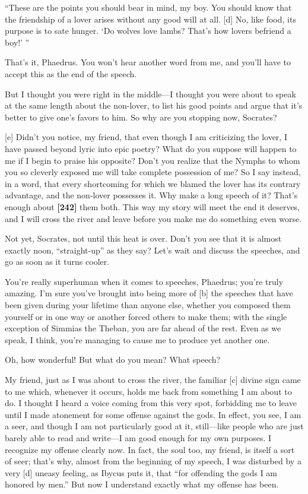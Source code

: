 “These are the points you should bear in mind, my boy. You should know
that the friendship of a lover arises without any good will at all.
{[}d{]} No, like food, its purpose is to sate hunger. ‘Do wolves love
lambs? That's how lovers befriend a boy!' ”

That's it, Phaedrus. You won't hear another word from me, and you'll
have to accept this as the end of the speech.

\sayphaedrus But I thought you were right in the middle---I thought you
were about to speak at the same length about the non-lover, to list his
good points and argue that it's better to give one's favors to him. So
why are you stopping now, Socrates?

{[}e{]} \saysocrates Didn't you notice, my friend, that even though I am
criticizing the lover, I have passed beyond lyric into epic
poetry? What do you
suppose will happen to me if I begin to praise his opposite? Don't you
realize that the Nymphs to whom you so cleverly exposed me will take
complete possession of me? So I say instead, in a word, that every
shortcoming for which we blamed the lover has its contrary advantage,
and the non-lover possesses it. Why make a long speech of it? That's
enough about {\bf {[}242{]}} them both. This way my story will meet the
end it deserves, and I will cross the river and leave before you make me
do something even worse.

\sayphaedrus Not yet, Socrates, not until this heat is over. Don't you see
that it is almost exactly noon, “straight-up” as they say? Let's wait
and discuss the speeches, and go as soon as it turns cooler.

\saysocrates You're really superhuman when it comes to speeches, Phaedrus;
you're truly amazing. I'm sure you've brought into being more of {[}b{]}
the speeches that have been given during your lifetime than anyone else,
whether you composed them yourself or in one way or another forced
others to make them; with the single exception of Simmias the Theban,
you are far ahead of the
rest. Even as we
speak, I think, you're managing to cause me to produce yet another one.

\sayphaedrus Oh, how wonderful! But what do you mean? What speech?

\saysocrates My friend, just as I was about to cross the river, the
familiar {[}c{]} divine sign came to me which, whenever it occurs, holds
me back from something I am about to do. I thought I heard a voice
coming from this very spot, forbidding me to leave until I made
atonement for some offense against the gods. In effect, you see, I am a
seer, and though I am not particularly good at it, still---like people
who are just barely able to read and write---I am good enough for my own
purposes. I recognize my offense clearly now. In fact, the soul too, my
friend, is itself a sort of seer; that's why, almost from the beginning
of my speech, I was disturbed by a very {[}d{]} uneasy feeling, as
Ibycus puts it, that “for offending the gods I am honored by
men.” But now I
understand exactly what my offense has been.

